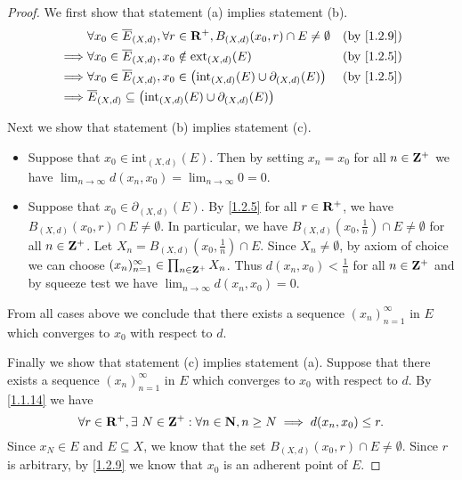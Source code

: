\begin{proof}
  We first show that statement (a) implies statement (b).
  \begin{align*}
             & \forall x_0 \in \overline{E}_{(X, d)}, \forall r \in \R^+, B_{(X, d)}(x_0, r) \cap E \neq \emptyset       & \text{(by \cref{1.2.9})} \\
    \implies & \forall x_0 \in \overline{E}_{(X, d)}, x_0 \notin \text{ext}_{(X, d)}(E)                                  & \text{(by \cref{1.2.5})} \\
    \implies & \forall x_0 \in \overline{E}_{(X, d)}, x_0 \in \big(\text{int}_{(X, d)}(E) \cup \partial_{(X, d)}(E)\big) & \text{(by \cref{1.2.5})} \\
    \implies & \overline{E}_{(X, d)} \subseteq \big(\text{int}_{(X, d)}(E) \cup \partial_{(X, d)}(E)\big)
  \end{align*}

  Next we show that statement (b) implies statement (c).
  \begin{itemize}
    \item Suppose that \(x_0 \in \text{int}_{(X, d)}(E)\).
          Then by setting \(x_n = x_0\) for all \(n \in \mathbf{Z}^+\) we have \(\lim_{n \to \infty} d(x_n, x_0) = \lim_{n \to \infty} 0 = 0\).
    \item Suppose that \(x_0 \in \partial_{(X, d)}(E)\).
          By \cref{1.2.5} for all \(r \in \mathbf{R}^+\), we have \(B_{(X, d)}(x_0, r) \cap E \neq \emptyset\).
          In particular, we have \(B_{(X, d)}(x_0, \frac{1}{n}) \cap E \neq \emptyset\) for all \(n \in \mathbf{Z}^+\).
          Let \(X_n = B_{(X, d)}(x_0, \frac{1}{n}) \cap E\).
          Since \(X_n \neq \emptyset\), by axiom of choice we can choose \((x_n)_{n = 1}^\infty \in \prod_{n \in \mathbf{Z}^+} X_n\).
          Thus \(d(x_n, x_0) < \frac{1}{n}\) for all \(n \in \mathbf{Z}^+\) and by squeeze test we have \(\lim_{n \to \infty} d(x_n, x_0) = 0\).
  \end{itemize}
  From all cases above we conclude that there exists a sequence \((x_n)_{n = 1}^\infty\) in \(E\) which converges to \(x_0\) with respect to \(d\).

  Finally we show that statement (c) implies statement (a).
  Suppose that there exists a sequence \((x_n)_{n = 1}^\infty\) in \(E\) which converges to \(x_0\) with respect to \(d\).
  By \cref{1.1.14} we have
  \[
    \forall r \in \mathbf{R}^+, \exists\ N \in \mathbf{Z}^+ : \forall n \in \mathbf{N}, n \geq N \implies d(x_n, x_0) \leq r.
  \]
  Since \(x_N \in E\) and \(E \subseteq X\), we know that the set \(B_{(X, d)}(x_0, r) \cap E \neq \emptyset\).
  Since \(r\) is arbitrary, by \cref{1.2.9} we know that \(x_0\) is an adherent point of \(E\).
\end{proof}

